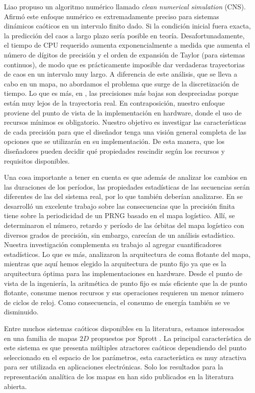 Liao \cite{Liao2013b, Liao2012, Liao2009} propuso un algoritmo numérico llamado \textit{clean numerical simulation} (CNS).
Afirmó este enfoque numérico es extremadamente preciso para sistemas dinámicos caóticos en un intervalo finito dado.
Si la condición inicial fuera exacta, la predicción del caos a largo plazo sería posible en teoría.
Desafortunadamente, el tiempo de CPU requerido aumenta exponencialmente a medida que aumenta el número de dígitos de precisión y el orden de expansión de Taylor (para sistemas continuos), de modo que es prácticamente imposible dar verdaderas trayectorias de caos en un intervalo muy largo.
A diferencia de este análisis, que se lleva a cabo en un mapa, no abordamos el problema que surge de la discretización de tiempo.
Lo que es más, en \cite{Liao2009}, las precisiones más bajas son despreciadas porque están muy lejos de la trayectoria real.
En contraposición, nuestro enfoque proviene del punto de vista de la implementación en hardware, donde el uso de recursos mínimos es obligatorio.
Nuestro objetivo es investigar las características de cada precisión para que el diseñador tenga una visión general completa de las opciones que se utilizarán en su implementación.
De esta manera, que los diseñadores pueden decidir qué propiedades rescindir según los recursos y requisitos disponibles.

Una cosa importante a tener en cuenta es que además de analizar los cambios en las duraciones de los períodos, las propiedades estadísticas de las secuencias serán diferentes de las del sistema real, por lo que también deberían analizarse.
En \cite{Persohn2012} se desarrolló un excelente trabajo sobre las consecuencias que la precisión finita tiene sobre la periodicidad de un PRNG basado en el mapa logístico.
Allí, se determinaron el número, retardo y período de las órbitas del mapa logístico con diversos grados de precisión, sin embargo, carecían de un análisis estadístico.
Nuestra investigación complementa su trabajo al agregar cuantificadores estadísticos.
Lo que es más, analizaron la arquitectura de coma flotante del mapa, mientras que aquí hemos elegido la arquitectura de punto fijo ya que es la arquitectura óptima para las implementaciones en hardware.
Desde el punto de vista de la ingeniería, la aritmética de punto fijo es más eficiente que la de punto flotante, consume menos recursos y sus operaciones requieren un menor número de ciclos de reloj.
Como consecuencia, el consumo de energía también se ve disminuido.

Entre muchos sistemas caóticos disponibles en la literatura, estamos interesados en una familia de mapas $2D$ propuestos por Sprott \cite{Sprott1993}.
La principal característica de este sistema es que presenta múltiples atractores caóticos dependiendo del punto seleccionado en el espacio de los parámetros, esta característica es muy atractiva para ser utilizada en aplicaciones electrónicas.
Solo los resultados para la representación analítica de los mapas en \cite{Sprott1993} han sido publicados en la literatura abierta.


